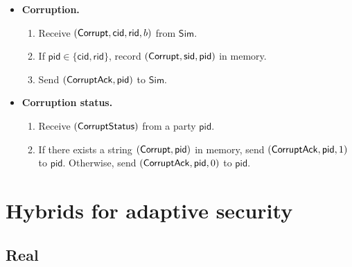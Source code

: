 \documentclass[11pt,letterpaper]{article}
\newcommand{\doclearpage}{%
  \iffull\clearpage\else\fi
}
\theoremstyle{plain} %
\theoremstyle{definition} %
\theoremstyle{remark} %
\newcommand{\Simulator}{{\mathsf{Sim}}} %
\newcommand{\sid}{\mathsf{sid}}
\newcommand{\CommitterId}{\mathsf{cid}}
\newcommand{\ReceiverId}{\mathsf{rid}}
\newcommand{\CommBit}{b}
\begin{document}
\begin{mdframed}
\begin{itemize}
\begin{itemize}
\item \textbf{Corruption.}
\newcommand{\pid}{\mathsf{pid}}
\begin{enumerate}[nolistsep]
\item Receive $(\CorruptMsg, \CommitterId, \ReceiverId, \CommBit)$ from $\Simulator$.
\item If $\pid \in \{\CommitterId, \ReceiverId\}$, record $(\CorruptMsg, \sid, \pid)$ in memory.
\item Send $(\CorruptAckMsg, \pid)$ to $\Simulator$.
\end{enumerate}

\item \textbf{Corruption status.}
\begin{enumerate}[nolistsep]
\item Receive $(\mathsf{CorruptStatus})$ from a party $\pid$.
\item If there exists a string $(\CorruptMsg, \pid)$ in memory, send $(\CorruptAckMsg, \pid, 1)$ to $\pid$. Otherwise, send $(\CorruptAckMsg, \pid, 0)$ to $\pid$.
\end{enumerate}
\end{itemize}
\end{itemize}
\end{mdframed}


\doclearpage
\section{Hybrids for adaptive security}
\label{sec:hybrids-adaptive}

\subsection{Real}
\label{sec:real-distr}
\end{document}
